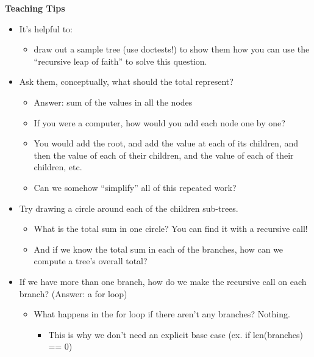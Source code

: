 \begin{guide}
	\begin{blocksection}
	\textbf{Teaching Tips}
	\begin{itemize}
			\item It’s helpful to:
			\begin{itemize}
				\item draw out a sample tree (use doctests!) to show them how you can use the “recursive leap of faith” to solve this question.
			\end{itemize}
			\item Ask them, conceptually, what should the total represent?
			\begin{itemize}
				\item Answer: sum of the values in all the nodes
                \item If you were a computer, how would you add each node one by one?
                \item You would add the root, and add the value at each of its children, and then the value of each of their children, and the value of each of their children, etc.
                \item Can we somehow “simplify” all of this repeated work?
            \end{itemize}
            \item Try drawing a circle around each of the children sub-trees.
            \begin{itemize}
                \item What is the total sum in one circle? You can find it with a recursive call!
                \item And if we know the total sum in each of the branches, how can we compute a tree's overall total?
            \end{itemize}
            \item If we have more than one branch, how do we make the recursive call on each branch? (Answer: a for loop)
            \begin{itemize}
                \item What happens in the for loop if there aren’t any branches? Nothing.
                \begin{itemize}
                    \item This is why we don’t need an explicit base case (ex. if len(branches) == 0)
                \end{itemize}
            \end{itemize}
	\end{itemize}
	\end{blocksection}
\end{guide}
